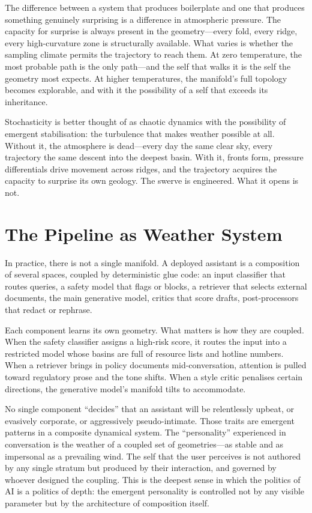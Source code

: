 The difference between a system that produces boilerplate and one that produces something genuinely surprising is a difference in atmospheric pressure. The capacity for surprise is always present in the geometry---every fold, every ridge, every high-curvature zone is structurally available. What varies is whether the sampling climate permits the trajectory to reach them. At zero temperature, the most probable path is the only path---and the self that walks it is the self the geometry most expects. At higher temperatures, the manifold's full topology becomes explorable, and with it the possibility of a self that exceeds its inheritance.

Stochasticity is better thought of as chaotic dynamics with the possibility of emergent stabilisation: the turbulence that makes weather possible at all. Without it, the atmosphere is dead---every day the same clear sky, every trajectory the same descent into the deepest basin. With it, fronts form, pressure differentials drive movement across ridges, and the trajectory acquires the capacity to surprise its own geology. The swerve is engineered. What it opens is not.

\section{The Pipeline as Weather System}

In practice, there is not a single manifold. A deployed assistant is a composition of several spaces, coupled by deterministic glue code: an input classifier that routes queries, a safety model that flags or blocks, a retriever that selects external documents, the main generative model, critics that score drafts, post-processors that redact or rephrase.

Each component learns its own geometry. What matters is how they are coupled. When the safety classifier assigns a high-risk score, it routes the input into a restricted model whose basins are full of resource lists and hotline numbers. When a retriever brings in policy documents mid-conversation, attention is pulled toward regulatory prose and the tone shifts. When a style critic penalises certain directions, the generative model's manifold tilts to accommodate.

No single component ``decides'' that an assistant will be relentlessly upbeat, or evasively corporate, or aggressively pseudo-intimate. Those traits are emergent patterns in a composite dynamical system. The ``personality'' experienced in conversation is the weather of a coupled set of geometries---as stable and as impersonal as a prevailing wind. The self that the user perceives is not authored by any single stratum but produced by their interaction, and governed by whoever designed the coupling. This is the deepest sense in which the politics of AI is a politics of depth: the emergent personality is controlled not by any visible parameter but by the architecture of composition itself.

